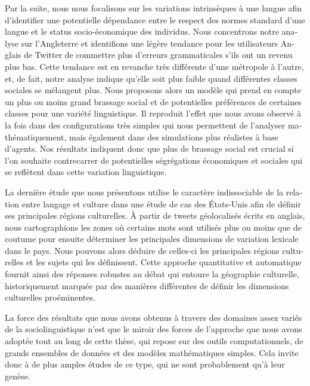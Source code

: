 \documentclass[../thesis.tex]{subfiles}
\begin{document}
\begin{otherlanguage}{french}
Par la suite, nous nous focalisons sur les variations intrinsèques à une langue afin
d'identifier une potentielle dépendance entre le respect des normes standard d'une
langue et le status socio-économique des individus. Nous concentrons notre analyse sur
l'Angleterre et identifions une légère tendance pour les utilisateurs Anglais de Twitter
de commettre plus d'erreurs grammaticales s'ils ont un revenu plus bas. Cette tendance
est en revanche très différente d'une métropole à l'autre, et, de fait, notre analyse
indique qu'elle soit plus faible quand différentes classes sociales se mélangent plus.
Nous proposons alors un modèle qui prend en compte un plus ou moins grand brassage
social et de potentielles préférences de certaines classes pour une variété
linguistique. Il reproduit l'effet que nous avons observé à la fois dans des
configurations très simples qui nous permettent de l'analyser mathématiquement, mais
également dans des simulations plus réalistes à base d'agents. Nos résultats indiquent
donc que plus de brassage social est crucial si l'on souhaite contrecarrer de
potentielles ségrégations économiques et sociales qui se reflètent dans cette variation
linguistique.

La dernière étude que nous présentons utilise le caractère indissociable de la relation
entre langage et culture dans une étude de cas des États-Unis afin de définir ses
principales régions culturelles. À partir de tweets géolocalisés écrits en anglais, nous
cartographions les zones où certains mots sont utilisés plus ou moins que de coutume
pour ensuite déterminer les principales dimensions de variation lexicale dans le pays.
Nous pouvons alors déduire de celles-ci les principales régions culturelles et les
sujets qui les définissent. Cette approche quantitative et automatique fournit ainsi des
réponses robustes au débat qui entoure la géographie culturelle, historiquement marquée
par des manières différentes de définir les dimensions culturelles proéminentes.

La force des résultats que nous avons obtenus à travers des domaines assez variés de la
sociolinguistique n'est que le miroir des forces de l'approche que nous avons adoptée
tout au long de cette thèse, qui repose sur des outils computationnels, de grands
ensembles de données et des modèles mathématiques simples. Cela invite donc à de plus
amples études de ce type, qui ne sont probablement qu'à leur genèse.
\end{otherlanguage}


\clearpage
\end{document}
